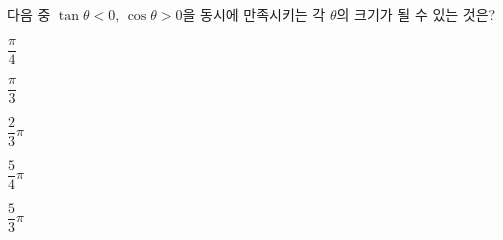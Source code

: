 다음 중 $\tan\theta<0$, $\cos\theta>0$을 동시에 만족시키는 각 $\theta$의 크기가 될 수 있는 것은?
\begin{choices32}{\rule[-3ex]{0pt}{8ex}$\dfrac{\pi}{4}$}{\rule[-3ex]{0pt}{8ex}$\dfrac{\pi}{3}$}{\rule[-3ex]{0pt}{8ex}$\dfrac{2}{3}\pi$}{\rule[-3ex]{0pt}{8ex}$\dfrac{5}{4}\pi$}{\rule[-3ex]{0pt}{8ex}$\dfrac{5}{3}\pi$}\end{choices32}
